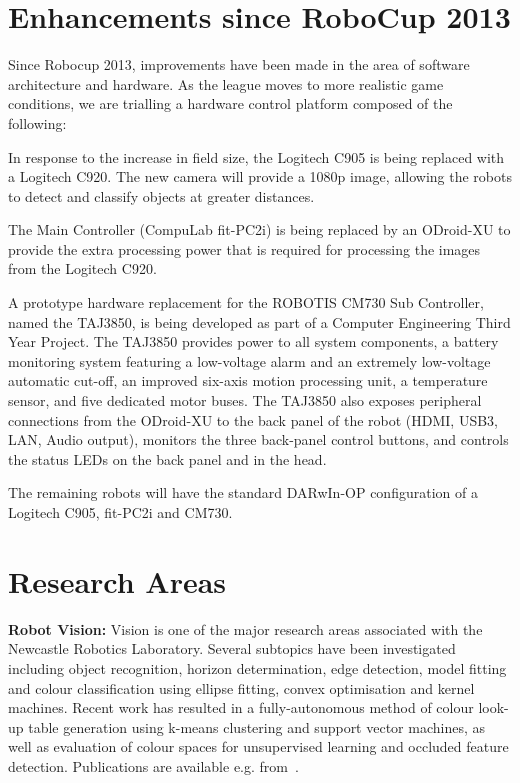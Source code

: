 \documentclass{llncs}
\begin{document}
\section{Enhancements since RoboCup 2013}
Since Robocup 2013, improvements have been made in the area of software architecture and hardware. As the league moves to more realistic game conditions, we are trialling a hardware control platform composed of the following:

In response to the increase in field size, the Logitech C905 is being replaced with a Logitech C920. The new camera will provide a 1080p image, allowing the robots to detect and classify objects at greater distances.

The Main Controller (CompuLab fit-PC2i) is being replaced by an ODroid-XU to provide the extra processing power that is required for processing the images from the Logitech C920.

A prototype hardware replacement for the ROBOTIS CM730 Sub Controller, named the TAJ3850, is
being developed as part of a Computer Engineering Third Year Project. The TAJ3850 provides power to all system components, a battery monitoring system featuring a low-voltage alarm and an extremely low-voltage automatic cut-off, an improved six-axis motion processing unit, a temperature sensor, and five dedicated motor buses. The TAJ3850 also exposes peripheral connections from the ODroid-XU to the back panel of the robot (HDMI, USB3, LAN, Audio output), monitors the three back-panel control buttons, and controls the status LEDs on the back panel and in the head.


The remaining robots will have the standard DARwIn-OP configuration of a Logitech C905, fit-PC2i and CM730.

\section{Research Areas}

\noindent\textbf{Robot Vision:} Vision is one of the major research areas associated with the Newcastle Robotics Laboratory. Several subtopics have been investigated including object recognition, horizon determination, edge detection, model fitting and colour classification using ellipse fitting, convex optimisation and kernel machines. Recent work has resulted in a fully-autonomous method of colour look-up table generation using k-means clustering and support vector machines, as well as evaluation of colour spaces for unsupervised learning and occluded feature detection. Publications are available e.g. from~\cite{budden2012colour,budden2012ball,henderson_2007,nickin_2007,NUBOT2006,Henderson2008,flannery2013ransac,budden2013salient}.
\\
\end{document}
